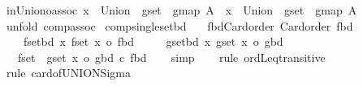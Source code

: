 \begin{isabellebody}
\endisatagproof
{\isafoldproof}%
%
\isadelimproof
\isanewline
%
\endisadelimproof
\isanewline
{}\isamarkupfalse%
\ in{\isacharunderscore}{\kern0pt}Union{\isacharunderscore}{\kern0pt}o{\isacharunderscore}{\kern0pt}assoc{\isacharcolon}{\kern0pt}\ {\isachardoublequoteopen}x\ {\isasymin}\ {\isacharparenleft}{\kern0pt}Union\ {\isasymcirc}\ gset\ {\isasymcirc}\ gmap{\isacharparenright}{\kern0pt}\ A\ {\isasymLongrightarrow}\ x\ {\isasymin}\ {\isacharparenleft}{\kern0pt}Union\ {\isasymcirc}\ {\isacharparenleft}{\kern0pt}gset\ {\isasymcirc}\ gmap{\isacharparenright}{\kern0pt}{\isacharparenright}{\kern0pt}\ A{\isachardoublequoteclose}\isanewline
%
\isadelimproof
\ \ %
\endisadelimproof
%
\isatagproof
{}\isamarkupfalse%
\ {\isacharparenleft}{\kern0pt}unfold\ comp{\isacharunderscore}{\kern0pt}assoc{\isacharparenright}{\kern0pt}%
\endisatagproof
{\isafoldproof}%
%
\isadelimproof
\isanewline
%
\endisadelimproof
\isanewline
{}\isamarkupfalse%
\ comp{\isacharunderscore}{\kern0pt}single{\isacharunderscore}{\kern0pt}set{\isacharunderscore}{\kern0pt}bd{\isacharcolon}{\kern0pt}\isanewline
\ \ \ fbd{\isacharunderscore}{\kern0pt}Card{\isacharunderscore}{\kern0pt}order{\isacharcolon}{\kern0pt}\ {\isachardoublequoteopen}Card{\isacharunderscore}{\kern0pt}order\ fbd{\isachardoublequoteclose}\ \isanewline
\ \ \ \ fset{\isacharunderscore}{\kern0pt}bd{\isacharcolon}{\kern0pt}\ {\isachardoublequoteopen}{\isasymAnd}x{\isachardot}{\kern0pt}\ {\isacharbar}{\kern0pt}fset\ x{\isacharbar}{\kern0pt}\ {\isasymle}o\ fbd{\isachardoublequoteclose}\ \isanewline
\ \ \ \ gset{\isacharunderscore}{\kern0pt}bd{\isacharcolon}{\kern0pt}\ {\isachardoublequoteopen}{\isasymAnd}x{\isachardot}{\kern0pt}\ {\isacharbar}{\kern0pt}gset\ x{\isacharbar}{\kern0pt}\ {\isasymle}o\ gbd{\isachardoublequoteclose}\isanewline
\ \ \ {\isachardoublequoteopen}{\isacharbar}{\kern0pt}{\isasymUnion}{\isacharparenleft}{\kern0pt}fset\ {\isacharbackquote}{\kern0pt}\ gset\ x{\isacharparenright}{\kern0pt}{\isacharbar}{\kern0pt}\ {\isasymle}o\ gbd\ {\isacharasterisk}{\kern0pt}c\ fbd{\isachardoublequoteclose}\isanewline
%
\isadelimproof
\ \ %
\endisadelimproof
%
\isatagproof
{}\isamarkupfalse%
\ simp\isanewline
\ \ \isamarkupfalse%
\ {\isacharparenleft}{\kern0pt}rule\ ordLeq{\isacharunderscore}{\kern0pt}transitive{\isacharparenright}{\kern0pt}\isanewline
\ \ \isamarkupfalse%
\ {\isacharparenleft}{\kern0pt}rule\ card{\isacharunderscore}{\kern0pt}of{\isacharunderscore}{\kern0pt}UNION{\isacharunderscore}{\kern0pt}Sigma{\isacharparenright}{\kern0pt}\isanewline

\end{isabellebody}
